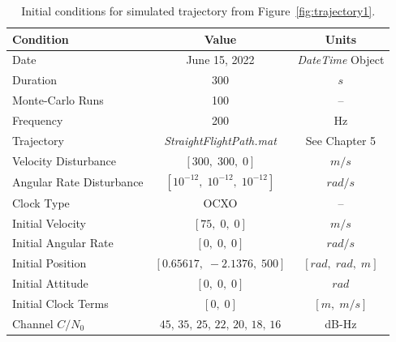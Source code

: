 \begin{table}[!ht]
    \caption{Initial conditions for simulated trajectory from Figure~\ref{fig:trajectory1}.}\label{tbl:trajectory}
    \centering
    \begin{tabular}{lcc}
        \toprule
        \textbf{Condition}       & \textbf{Value}                                      & \textbf{Units}                     \\
        \midrule
        Date                     & June 15, 2022                                       & \textit{DateTime} Object           \\
        Duration                 & 300                                                 & \(s\)                              \\
        Monte-Carlo Runs         & 100                                                 & {--}                               \\
        Frequency                & 200                                                 & Hz                                 \\
        Trajectory               & \textit{StraightFlightPath.mat}                     & See Chapter 5                      \\
        Velocity Disturbance     & \(\left[300, \; 300, \; 0\right]\)                  & \(m/s\)                            \\
        Angular Rate Disturbance & \(\left[10^{-12}, \; 10^{-12}, \; 10^{-12}\right]\) & \(rad/s\)                          \\
        Clock Type               & OCXO                                                & {--}                               \\
        Initial Velocity         & \(\left[75, \; 0, \; 0\right]\)                     & \(m/s\)                            \\
        Initial Angular Rate     & \(\left[0, \; 0, \; 0\right]\)                      & \(rad/s\)                          \\
        Initial Position         & \(\left[0.65617, \; -2.1376, \; 500\right]\)        & \(\left[rad, \; rad, \; m\right]\) \\
        Initial Attitude         & \(\left[0, \; 0, \; 0\right]\)                      & \(rad\)                            \\
        Initial Clock Terms      & \(\left[0, \; 0\right]\)                            & \(\left[m, \; m/s\right]\)         \\
        Channel \(C/N_0\)        & \(45,\,35,\,25,\,22,\,20,\,18,\,16\)                & dB-Hz                              \\

        \bottomrule
    \end{tabular}
\end{table}

